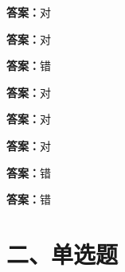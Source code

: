 \documentclass[12pt]{ctexart}
\begin{document}
\begin{questions}
\question {}\ifprintanswers\par\textbf{答案：}对\fi
\question {}\ifprintanswers\par\textbf{答案：}对\fi
\question {}\ifprintanswers\par\textbf{答案：}错\fi
\question {}\ifprintanswers\par\textbf{答案：}对\fi
\question {}\ifprintanswers\par\textbf{答案：}对\fi
\question {}\ifprintanswers\par\textbf{答案：}对\fi
\question {}\ifprintanswers\par\textbf{答案：}错\fi
\question {}\ifprintanswers\par\textbf{答案：}错\fi
\end{questions}
\section*{二、单选题}
\end{document}
